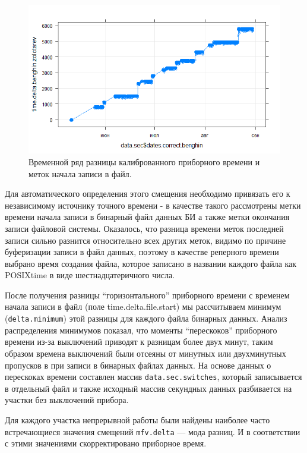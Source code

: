 \begin{figure}
	\centering
	\includegraphics[width=0.9\linewidth]{images/deprontimeplot}
	\caption[Временной ряд разницы калиброванного приборного времени и меток начала записи в файл.]{Временной ряд разницы калиброванного приборного времени и меток начала записи в файл.}
	\label{fig:deprontimeplot}
\end{figure}


Для автоматического определения этого смещения необходимо привязать его к независимому источнику точного времени - в качестве такого рассмотрены метки времени начала записи в бинарный файл данных БИ а также метки окончания записи файловой системы. Оказалось, что разница времени меток последней записи сильно разнится относительно всех других меток, видимо по причине буферизации записи в файл данных, поэтому в качестве реперного времени выбрано время создания файла, которое записано в названии каждого файла как POSIXtime в виде шестнадцатеричного числа.

После получения разницы ``горизонтального'' приборного времени с временем начала записи в файл (поле time.delta.file.start) мы рассчитываем минимум (\texttt{delta.minimum}) этой разницы для каждого файла бинарных данных. Анализ распределения минимумов показал, что моменты ``перескоков'' приборного времени из-за выключений приводят к разницам более двух минут, таким образом времена выключений были отсеяны от минутных или двухминутных пропусков в при записи в бинарных файлах данных. На основе данных о перескоках времени составлен массив \texttt{data.sec.switches}, который записывается в отдельный файл и также исходный массив секундных данных разбивается на участки без выключений прибора.

Для каждого участка непрерывной работы были найдены наиболее часто встречающиеся значения смещений \texttt{mfv.delta} --- мода разниц. И в соответствии с этими значениями скорректировано приборное время.

